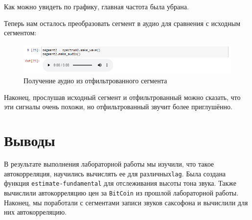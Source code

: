 \documentclass[a4paper]{article}
\begin{document}
            Как можно увидеть по графику, главная частота была убрана.
            
            Теперь нам осталось преобразовать сегмент в аудио для сравнения с исходным сегментом:
            
            \begin{figure}[H]
                \centering
                \includegraphics[width=\textwidth]{ex_4_spectr_2_audio.png}
                \caption{Получение аудио из отфильтрованного сегмента}
                \label{fig:ex_4_spectr_2_audio}
            \end{figure}
            
            Наконец, прослушав исходный сегмент и отфильтрованный можно сказать, что эти сигналы очень похожи, но отфильтрованный звучит более приглушённо.
            
    \newpage
        \section{Выводы}
            В результате выполнения лабораторной работы мы изучили, что такое автокорреляция, научились вычислять ее для различных\texttt{lag}. Была создана функция \texttt{estimate-fundamental} для отслеживания высоты тона звука. Также вычислили автокорреляцию цен за \texttt{BitCoin} из прошлой лабораторной работы. Наконец, мы поработали с сегментами записи звуков саксофона и вычислили для них автокорреляцию.
           
           
            
\end{document}

